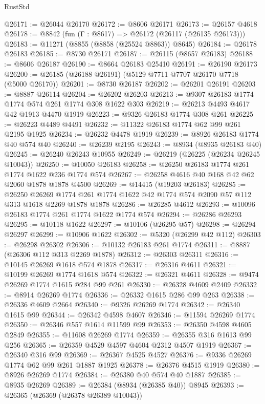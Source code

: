 \begin{lexlean}{RustStd}
\begin{coremodule}
@26171 := @26044 @26170
@26172 := @8606 @26171
@26173 := @26157 @4618
@26178 := @8842 (fun (Γ : @8617) => @26172 (@26117 (@26135 @26173)))
@26183 := @11271 (@8855 (@8858 (@25524 @8863)) @8645)
@26184 := @26178 @26183
@26185 := @8730 @26171
@26187 := @26115 (@8657 @26183)
@26188 := @8606 @26187
@26190 := @8664 @26183 @25410
@26191 := @26190 @26173
@26200 := @26185 (@26188 @26191) (@5129 @7711 @7707 @26170 @7718 (@5000 @26170))
@26201 := @8730 @26187
@26202 := @26201 @26191
@26203 := @8887 @26114
@26204 := @26202 @26203
@26213 := @9307 @26183 @1774 @1774 @574 @261 @1774 @308 @1622 @303
@26219 := @26213 @4493 @4617 @42 @1913 @4470 @1919
@26223 := @9326 @26183 @1774 @308 @261
@26225 := @26223 @4489 @4491
@26232 := @11322 @26183 @1774 @62 @99 @261 @2195 @1925
@26234 := @26232 @4478 @1919
@26239 := @8926 @26183 @1774 @40 @574 @40
@26240 := @26239 @2195
@26243 := @8934 (@8935 @26183 @40)
@26245 := @26240 @26243 @10955
@26249 := @26219 (@26225 (@26234 @26245 @10043))
@26250 := @10050 @26183
@26258 := @26250 @26183 @1774 @261 @1774 @1622 @236 @1774 @574
@26267 := @26258 @4616 @40 @168 @42 @62 @2060 @1878 @1878 @4500
@26269 := @14415 (@19203 @26183)
@26285 := @26250
    @26269
    @1774
    @261
    @1774
    @1622
    @42
    @1774
    @574
    @2090
    @57
    @112
    @313
    @1618
    @2269
    @1878
    @1878
@26286 := @26285 @4612
@26293 := @10096 @26183 @1774 @261 @1774 @1622 @1774 @574
@26294 := @26286 @26293
@26295 := @10118 @1622
@26297 := @10106 (@26295 @57)
@26298 := @26294 @26297
@26299 := @10906 @1622
@26302 := @5320 (@26299 @42 @112)
@26303 := @26298 @26302
@26306 := @10132 @26183 @261 @1774
@26311 := @8887 (@26306 @112 @313 @2269 @1878)
@26312 := @26303 @26311
@26316 := @10145 @26269 @1618 @574 @1878
@26317 := @26316 @4611
@26321 := @10199 @26269 @1774 @1618 @574
@26322 := @26321 @4611
@26328 := @9474 @26269 @1774 @1615 @284 @99 @261
@26330 := @26328 @4609 @2409
@26332 := @8914 @26269 @1774
@26336 := @26332 @1615 @286 @99 @263
@26338 := @26336 @4609 @2664
@26340 := @9326 @26269 @1774
@26342 := @26340 @1615 @99
@26344 := @26342 @4598 @4607
@26346 := @11594 @26269 @1774
@26350 := @26346 @557 @1614 @11599 @99
@26353 := @26350 @4598 @4605 @2849
@26355 := @11608 @26269 @1774
@26359 := @26355 @316 @1613 @99 @256
@26365 := @26359 @4529 @4597 @4604 @2312 @4507 @1919
@26367 := @26340 @316 @99
@26369 := @26367 @4525 @4527
@26376 := @9336 @26269 @1774 @62 @99 @261 @1887 @1925
@26378 := @26376 @4515 @1919
@26380 := @8926 @26269 @1774
@26384 := @26380 @40 @574 @40 @1887
@26385 := @8935 @26269
@26389 := @26384 (@8934 (@26385 @40)) @8945
@26393 := @26365 (@26369 (@26378 @26389 @10043))

\end{coremodule}
\end{lexlean}
